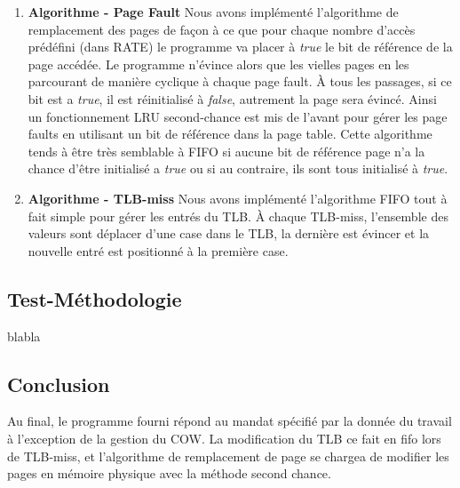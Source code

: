 \documentclass{article}
\begin{document}
\begin{enumerate}
	
	\item \textbf{Algorithme - Page Fault} 
  Nous avons implémenté l'algorithme de remplacement des pages de façon à ce que pour chaque nombre d'accès prédéfini (dans RATE) le programme va placer à 
  {\em true} le bit de référence de la page accédée. Le programme n'évince alors que les vielles pages en les parcourant de manière cyclique à chaque page fault. À tous les passages, si ce bit est a {\em true}, il est réinitialisé à {\em false}, autrement la page sera évincé. Ainsi un fonctionnement LRU second-chance est mis de l'avant pour gérer les page faults en utilisant un bit de référence dans la page table. Cette algorithme tends à être très semblable à FIFO si aucune bit de référence page n'a la chance d'être initialisé a {\em true} ou si au contraire, ils sont tous initialisé à {\em true}.
  
  \item \textbf{Algorithme - TLB-miss} 
  Nous avons implémenté l'algorithme FIFO tout à fait simple pour gérer les entrés du TLB. À chaque TLB-miss,
  l'ensemble des valeurs sont déplacer d'une case dans le TLB, la dernière est évincer et la nouvelle entré est positionné à la première case.
	
	
\end{enumerate}


\subsection*{Test-Méthodologie}

blabla


\subsection*{Conclusion}
Au final, le programme fourni répond au mandat spécifié par la donnée du travail à l'exception de la gestion du COW. La modification du TLB ce fait en fifo lors de TLB-miss, et l'algorithme de remplacement de page se chargea de modifier les pages en mémoire physique avec la méthode second chance. 
\end{document}
